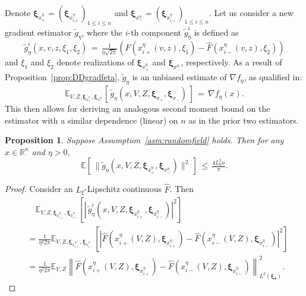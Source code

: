 \documentclass[11pt,reqno]{amsart}
\newcommand{\1}{{\bf 1}}
\newcommand{\2}{{\bf 2}}
\newcommand{\pc}[1]{{\color{cyan}#1}}
\newcommand{\us}[1]{\textcolor{red}{#1}}
\newcommand{\bxi}{\boldsymbol{\xi}}
\newcommand{\E}{\mathbb E}
\newcommand{\R}{\mathbb R}
\numberwithin{equation}{section}
\newtheorem{proposition}{Proposition}[section]
\theoremstyle{remark}
\newcommand{\beq}{\begin{equation}}
\newcommand{\eeq}{\end{equation}}
\begin{document}
{				Denote $\bxi_{x_+^\eta}=(\bxi_{x_{i+}^\eta})_{1\leq i\leq n}$ and $\bxi_{x_-^\eta}=(\bxi_{x_{i-}^\eta})_{1\leq i\leq n}$. Let us consider a new gradient estimator $\tilde{g}_{\eta}$, where the $i$-th component $\tilde{g}_{\eta}^i$ is defined as 
				\begin{equation*}
					\tilde g_{\eta}^i \left(x,v,z,\xi_1,\xi_2\right) \, = \,\tfrac{1}{\eta\sqrt{2\pi}}\left(\hat{F}\left(x_{i+}^\eta(v,z), \xi_1\right)-\hat{F}\left(x_{i-}^\eta(v,z), \xi_2\right)\right)
				\end{equation*}
				and $\xi_1$ and $\xi_2$ denote realizations of $\bxi_{x_+^\eta}$ and $\bxi_{x_-^\eta}$, respectively. As a result of Proposition~\ref{prop:DDgradfeta}, $\tilde{g}_{\eta}$ is an unbiased estimate of $\nabla f_{\eta}$, as qualified in: 
				\beq\label{eq:unbiasedd-dd-2}
				\E_{V,Z,\bxi_{x_+^\eta},\bxi_{x_-^\eta}}  \left[\, \tilde{g}_{\eta}(x,V,Z,\bxi_{x_{+}}, \bxi_{x_{-}}) \, \right]  \, = \, \nabla f_{\eta}(x).
				\eeq
				This then allows for deriving an analogous second moment bound on the estimator {with a similar dependence (linear) on $n$ as in the prior two estimators.}
				\begin{proposition}\label{prop:DDsecmombd}
					Suppose Assumption~\ref{asm:randomfield} holds. Then for any $x\in \R^n$ and $\eta > 0$,
					\begin{equation}
						\mathbb{E}\left[\, \|\tilde{g}_\eta(x,V,Z,\bxi_{x_{+}^{\eta}},\bxi_{x_{-}^{\eta}})\|^2\, \right] \, \leq \, \tfrac{4L_0^2n}{\pi}.
					\end{equation}
				\end{proposition}
				\begin{proof}
				Consider an $L_\xi$-Lipschitz continuous $\hat{F}$. Then 
				\begin{align*}
					& \quad \mathbb{E}_{V,Z,\bxi_{x_{i+}^\eta},\bxi_{x_{i-}^\eta}}\left[\left|\, \tilde g_{\eta}^i\left(x,V,Z,\bxi_{x_{i+}^\eta},\bxi_{x_{i-}^\eta}\right)\right|^2\right] \\
					& = \tfrac{1}{\eta^2 2\pi}\mathbb{E}_{V,Z,\bxi_{x_{i+}^\eta},\bxi_{x_{i-}^\eta}}\left[\left|\hat{F}\left(x_{i+}^\eta(V,Z), \bxi_{x_{i+}^\eta}\right)-\hat{F}\left(x_{i-}^\eta(V,Z), \bxi_{x_{i-}^\eta}\right)\right|^2\right]\\
					&= \tfrac{1}{\eta^2 2\pi} \mathbb{E}_{V,Z} \left\|\hat{F}\left(x_{i+}^\eta(V,Z), \bxi_{x_{i+}^\eta}\right)-\hat{F}\left(x_{i-}^\eta(V,Z), \bxi_{x_{i-}^\eta}\right)\right\|_{L^2(\bxi_\bullet)}^2.

\end{align*}
\end{proof}}
\end{document}
